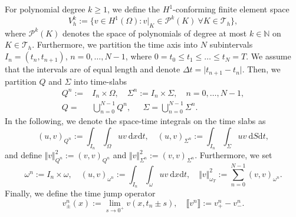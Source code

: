 \documentclass[sn-mathphys-num]{sn-jnl}
\numberwithin{equation}{section}
\newcommand{\jump}[1]{\llbracket#1\rrbracket}
\newcommand{\dT}{\mathrm{d}t}
\newcommand{\dX}{\mathrm{d}x}
\newcommand{\dS}{\mathrm{d}S}
\begin{document}
For polynomial degree $k \ge 1$, we define the $H^1$-conforming finite element space 
\begin{equation}
    V_h^k := \{ v \in H^1(\Omega) : v \vert_{K} \in \mathcal{P}^k(K) \ \forall K \in \mathcal{T}_h \},
\end{equation}
where $\mathcal{P}^k(K)$ denotes the space of polynomials of degree at most $k \in \mathbb{N}$ on $K \in \mathcal{T}_h$. Furthermore, we partition the time axis into $N$ subintervals $I_n = (t_n,t_{n+1})$, $n = 0, \dots, N-1$, where $0 = t_0 \le t_1 \le \dots \le t_N = T$. We assume that the intervals are of equal length and denote $\Delta t = \vert t_{n+1} -t_n \vert$. Then, we partition $Q$ and $\Sigma$ into time-slabs 
\begin{equation}
    \begin{aligned}
        Q^n := &I_n \times \Omega, \quad \Sigma^n := I_n \times \Sigma, \quad n = 0, \dots, N-1, \\
        Q = &\bigcup_{n = 0}^{N-1} Q^n, \quad \phantom{:} \Sigma = \bigcup_{n = 0}^{N-1} \Sigma^n.
    \end{aligned}
\end{equation}
In the following, we denote the space-time integrals on the time slabs as 
\begin{equation*}
    (u,v)_{Q^n} := \int_{I_n} \int_{\Omega} uv \ \dX \dT, \quad (u,v)_{\Sigma^n} := \int_{I_n} \int_{\Sigma} uv \ \dS \dT,
\end{equation*}
and define $\Vert v \Vert^2_{Q^n} := (v,v)_{Q^n}$ and $\Vert v \Vert^2_{\Sigma^n} := (v,v)_{\Sigma^n}$. 
Furthermore, we set 
\begin{equation*}
    \omega^n := I_n \times \omega, \quad (u,v)_{\omega^n} := \int_{I_n} \int_{\omega} uv \ \dX \dT, \quad \Vert v \Vert^2_{\omega_T} := \sum_{n = 0}^{N-1} (v,v)_{\omega^n}.
\end{equation*}
Finally, we define the time jump operator 
\begin{equation*}
    v^n_{\pm} (x) := \lim_{s \rightarrow 0^+} v(x,t_n \pm s), \quad \jump{v^n} := v^n_+ - v^n_-. 
\end{equation*}
\end{document}
